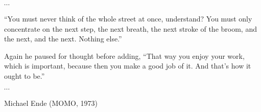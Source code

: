 \thispagestyle{empty}
\label{aipua}

\vspace*{10mm}

\begin{center}

$\cdots$

``You must never think of the whole street at once, understand? You must only concentrate on the next step, the next breath, the next stroke of the broom, and the next, and the next. Nothing else.''

\smallskip
\smallskip
Again he paused for thought before adding, ``That way you enjoy your work, 
which is important, because then you make a good job of it. And that's how 
it ought to be.''

$\cdots$

\end{center}

\begin{flushright}
Michael Ende (MOMO, 1973)
\end{flushright}

